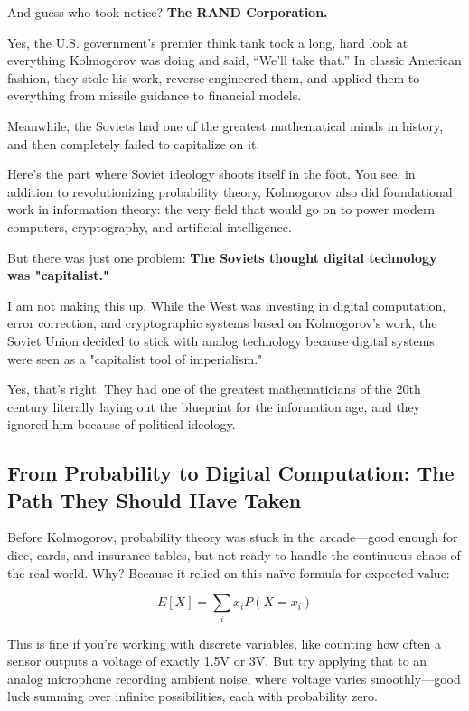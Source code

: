 And guess who took notice? \textbf{The RAND Corporation.}

Yes, the U.S. government’s premier think tank took a long, hard look at everything Kolmogorov was doing and said, “We’ll take that.” In classic American fashion, they stole his work, reverse-engineered them, and applied them to everything from missile guidance to financial models.

Meanwhile, the Soviets had one of the greatest mathematical minds in history, and then completely failed to capitalize on it.

Here’s the part where Soviet ideology shoots itself in the foot. You see, in addition to revolutionizing probability theory, Kolmogorov also did foundational work in information theory: the very field that would go on to power modern computers, cryptography, and artificial intelligence. 

But there was just one problem: \textbf{The Soviets thought digital technology was "capitalist."}  

I am not making this up. While the West was investing in digital computation, error correction, and cryptographic systems based on Kolmogorov’s work, the Soviet Union decided to stick with analog technology because digital systems were seen as a "capitalist tool of imperialism." 

Yes, that’s right. They had one of the greatest mathematicians of the 20th century literally laying out the blueprint for the information age, and they ignored him because of political ideology.  


\subsection{From Probability to Digital Computation: The Path They Should Have Taken}  

Before Kolmogorov, probability theory was stuck in the arcade—good enough for dice, cards, and insurance tables, but not ready to handle the continuous chaos of the real world. Why? Because it relied on this naïve formula for expected value:

\[
E[X] = \sum_{i} x_i P(X = x_i)
\]

This is fine if you’re working with discrete variables, like counting how often a sensor outputs a voltage of exactly 1.5V or 3V. But try applying that to an analog microphone recording ambient noise, where voltage varies smoothly—good luck summing over infinite possibilities, each with probability zero.

